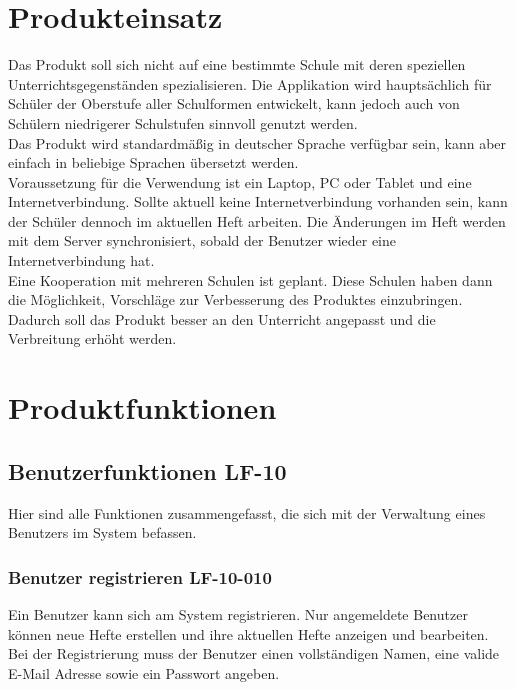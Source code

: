 \documentclass[12pt,a4paper,oneside,ngerman]{scrartcl}
\begin{document}
\section{Produkteinsatz}
Das Produkt soll sich nicht auf eine bestimmte Schule mit deren speziellen Unterrichtsgegenständen spezialisieren. Die Applikation wird hauptsächlich für Schüler der Oberstufe aller Schulformen entwickelt, kann jedoch auch von Schülern niedrigerer Schulstufen sinnvoll genutzt werden.\\

Das Produkt wird standardmäßig in deutscher Sprache verfügbar sein, kann aber einfach in beliebige Sprachen übersetzt werden.\\

Voraussetzung für die Verwendung ist ein Laptop, PC oder Tablet und eine Internetverbindung. Sollte aktuell keine Internetverbindung vorhanden sein, kann der Schüler dennoch im aktuellen Heft arbeiten. Die Änderungen im Heft werden mit dem Server synchronisiert, sobald der Benutzer wieder eine Internetverbindung hat.\\

Eine Kooperation mit mehreren Schulen ist geplant. Diese Schulen haben dann die Möglichkeit, Vorschläge zur Verbesserung des Produktes einzubringen. Dadurch soll das Produkt besser an den Unterricht angepasst und die Verbreitung erhöht werden.

\section{Produktfunktionen}
\subsection[Benutzerfunktionen]{Benutzerfunktionen \hfill LF-10}
Hier sind alle Funktionen zusammengefasst, die sich mit der Verwaltung eines Benutzers im System befassen.
\subsubsection{Benutzer registrieren \hfill LF-10-010}
Ein Benutzer kann sich am System registrieren. Nur angemeldete Benutzer können neue Hefte erstellen und ihre aktuellen Hefte anzeigen und bearbeiten. Bei der Registrierung muss der Benutzer einen vollständigen Namen, eine valide E-Mail Adresse sowie ein Passwort angeben.
\end{document}
